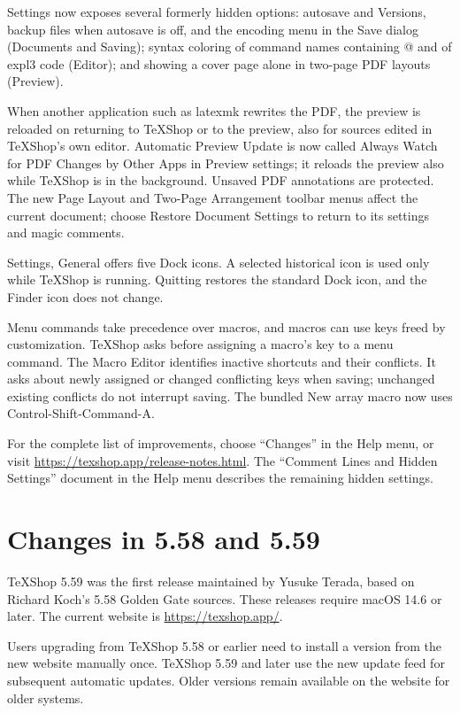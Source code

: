 \documentclass[11pt, oneside]{amsart}
\begin{document}
Settings now exposes several formerly hidden options: autosave and Versions, backup files when autosave is off, and the encoding menu in the Save dialog (Documents and Saving); syntax coloring of command names containing @ and of expl3 code (Editor); and showing a cover page alone in two-page PDF layouts (Preview).

When another application such as latexmk rewrites the PDF, the preview is reloaded on returning to TeXShop or to the preview, also for sources edited in TeXShop's own editor. Automatic Preview Update is now called Always Watch for PDF Changes by Other Apps in Preview settings; it reloads the preview also while TeXShop is in the background. Unsaved PDF annotations are protected. The new Page Layout and Two-Page Arrangement toolbar menus affect the current document; choose Restore Document Settings to return to its settings and magic comments.

Settings, General offers five Dock icons. A selected historical icon is used only while TeXShop is running. Quitting restores the standard Dock icon, and the Finder icon does not change.

Menu commands take precedence over macros, and macros can use keys freed by customization. TeXShop asks before assigning a macro's key to a menu command. The Macro Editor identifies inactive shortcuts and their conflicts. It asks about newly assigned or changed conflicting keys when saving; unchanged existing conflicts do not interrupt saving. The bundled New array macro now uses Control-Shift-Command-A.

For the complete list of improvements, choose ``Changes'' in the Help menu, or visit \url{https://texshop.app/release-notes.html}. The ``Comment Lines and Hidden Settings'' document in the Help menu describes the remaining hidden settings.

\section{Changes in 5.58 and 5.59}

TeXShop 5.59 was the first release maintained by Yusuke Terada, based on Richard Koch's 5.58 Golden Gate sources. These releases require macOS 14.6 or later. The current website is \url{https://texshop.app/}.

Users upgrading from TeXShop 5.58 or earlier need to install a version from the new website manually once. TeXShop 5.59 and later use the new update feed for subsequent automatic updates. Older versions remain available on the website for older systems.
\end{document}
